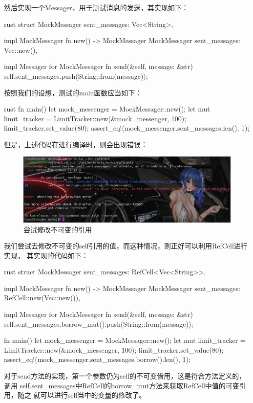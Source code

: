 然后实现一个Messager，用于测试消息的发送，其实现如下：
\begin{code-block}{rust}
struct MockMessager {
    sent_messages: Vec<String>,
}

impl MockMessager {
    fn new() -> MockMessager {
        MockMessager {
            sent_messages: Vec::new(),
        }
    }
}

impl Messager for MockMessager {
    fn send(&self, message: &str) {
        self.sent_messages.push(String::from(message));
    }
}
\end{code-block}

按照我们的设想，测试的main函数应当如下：
\begin{code-block}{rust}
fn main() {
    let mock_messenger = MockMessager::new();
    let mut limit_tracker = LimitTracker::new(&mock_messenger, 100);
    limit_tracker.set_value(80);
    assert_eq!(mock_messenger.sent_messages.len(), 1);
}
\end{code-block}

但是，上述代码在进行编译时，则会出现错误：
\begin{figure}[H]
  \centering
  \includegraphics[width=\linewidth]{rust_ref_error.png}
  \caption{尝试修改不可变的引用}
  \label{fig:rust_ref_error}
\end{figure}

我们尝试去修改不可变的self引用的值，而这种情况，则正好可以利用RefCell进行实现，
其实现的代码如下：
\begin{code-block}{rust}
struct MockMessager {
    sent_messages: RefCell<Vec<String>>,
}

impl MockMessager {
    fn new() -> MockMessager {
        MockMessager {
            sent_messages: RefCell::new(Vec::new()),
        }
    }
}

impl Messager for MockMessager {
    fn send(&self, message: &str) {
        self.sent_messages.borrow_mut().push(String::from(message));
    }
}

fn main() {
    let mock_messenger = MockMessager::new();
    let mut limit_tracker = LimitTracker::new(&mock_messenger, 100);
    limit_tracker.set_value(80);
    assert_eq!(mock_messenger.sent_messages.borrow().len(), 1);
}
\end{code-block}
对于send方法的实现，第一个参数仍为self的不可变借用，这是符合方法定义的，调用
self.sent\_messages中RefCell的borrow\_mut方法来获取RefCell中值的可变引用，随之
就可以进行self当中的变量的修改了。

